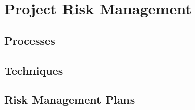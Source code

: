 \chapter{Project Risk Management}

\section{Processes}

\section{Techniques}

\section{Risk Management Plans}